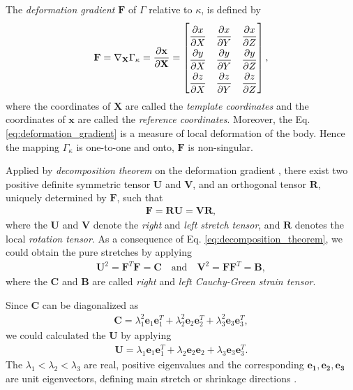 \documentclass{llncs}
\begin{document}
The \emph{deformation gradient} $\mathbf{F}$ of $\Gamma$ relative to $\kappa$, is defined by
 \begin{align}
  \mathbf{F}= \nabla_{\mathbf{X}} \Gamma_{\kappa} = \dfrac{\partial \mathbf{x}}{\partial \mathbf{X}}
  =
  \renewcommand\arraystretch{2}
  \begin{bmatrix}
    \dfrac{\partial x}{\partial X} & \dfrac{\partial x}{\partial Y} & \dfrac{\partial x}{\partial Z}  \\
    \dfrac{\partial y}{\partial X} & \dfrac{\partial y}{\partial Y} & \dfrac{\partial y}{\partial Z}  \\
    \dfrac{\partial z}{\partial X} & \dfrac{\partial z}{\partial Y} & \dfrac{\partial z}{\partial Z}  \\ 
  \end{bmatrix},  
 \label{eq:deformation_gradient} 
 \end{align}
where the coordinates of $\mathbf{X}$ are called the \emph{template coordinates} and the coordinates of $\mathbf{x}$ are called the \emph{reference coordinates}. Moreover, the Eq. \eqref{eq:deformation_gradient} is a measure of local deformation of the body. Hence the mapping $\Gamma_{\kappa}$ is one-to-one and onto, $\mathbf{F}$ is non-singular. 

Applied by \emph{decomposition theorem} on the deformation gradient \cite{liu2002continuum}, there exist two positive definite symmetric tensor $\mathbf{U}$ and $\mathbf{V}$, and an orthogonal tensor $\mathbf{R}$, uniquely determined by $\mathbf{F}$, such that 
\begin{align}
\mathbf{F}=\mathbf{R}\mathbf{U}=\mathbf{V}\mathbf{R},
\label{eq:decomposition_theorem}
\end{align}
where the $\mathbf{U}$ and $\mathbf{V}$ denote the \emph{right} and \emph{left stretch tensor}, and $\mathbf{R}$ denotes the local \emph{rotation tensor}. As a consequence of Eq. \eqref{eq:decomposition_theorem}, we could obtain the pure stretches by applying
 \begin{align}
  \mathbf{U}^2=\mathbf{F}^T\mathbf{F}=\mathbf{C} \quad \mbox{and} \quad \mathbf{V}^2=\mathbf{F}\mathbf{F}^T=\mathbf{B},
  \label{eq:stretch_tensor}
 \end{align} 
where the $\mathbf{C}$ and $\mathbf{B}$ are called \emph{right} and \emph{left Cauchy-Green strain tensor}.

Since $\mathbf{C}$ can be diagonalized as 
\begin{align}
\mathbf{C} =  \lambda_1^2 \mathbf{e}_1 \mathbf{e}_1^T+ \lambda_2^2 \mathbf{e}_2 \mathbf{e}_2^T+ \lambda_3^2 \mathbf{e}_3 \mathbf{e}_3^T,
\end{align}
we could calculated the $\mathbf{U}$ by applying 
\begin{align}
\mathbf{U} =  \lambda_1 \mathbf{e}_1 \mathbf{e}_1^T+ \lambda_2 \mathbf{e}_2 \mathbf{e}_2+ \lambda_3 \mathbf{e}_3 \mathbf{e}_3^T.
\label{eq:strech_tensor_diagonalized}
\end{align}
The $\lambda_1<\lambda_2<\lambda_3$ are real, positive eigenvalues and the corresponding $\mathbf{e_1},\mathbf{e_2},\mathbf{e_3}$ are unit eigenvectors, defining main stretch or shrinkage directions \cite{wriggers2013nichtlineare}.
\end{document}
